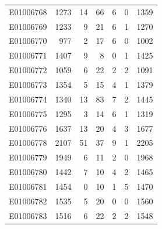 \documentclass[
  letterpaper,
  DIV=11,
  numbers=noendperiod]{scrreprt}
\begin{document}
\begin{tabular}{lrrrrrr}
E01006768     &    1273 &      14 &                    66 &                               6 &                       0 &              1359 \\
E01006769     &    1233 &       9 &                    21 &                               6 &                       1 &              1270 \\
E01006770     &     977 &       2 &                    17 &                               6 &                       0 &              1002 \\
E01006771     &    1407 &       9 &                     8 &                               0 &                       1 &              1425 \\
E01006772     &    1059 &       6 &                    22 &                               2 &                       2 &              1091 \\
E01006773     &    1354 &       5 &                    15 &                               4 &                       1 &              1379 \\
E01006774     &    1340 &      13 &                    83 &                               7 &                       2 &              1445 \\
E01006775     &    1295 &       3 &                    14 &                               6 &                       1 &              1319 \\
E01006776     &    1637 &      13 &                    20 &                               4 &                       3 &              1677 \\
E01006778     &    2107 &      51 &                    37 &                               9 &                       1 &              2205 \\
E01006779     &    1949 &       6 &                    11 &                               2 &                       0 &              1968 \\
E01006780     &    1442 &       7 &                    10 &                               4 &                       2 &              1465 \\
E01006781     &    1454 &       0 &                    10 &                               1 &                       5 &              1470 \\
E01006782     &    1535 &       5 &                    20 &                               0 &                       0 &              1560 \\
E01006783     &    1516 &       6 &                    22 &                               2 &                       2 &              1548 \\

\end{tabular}
\end{document}
